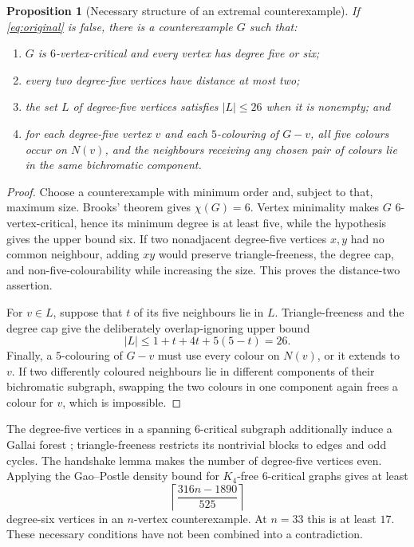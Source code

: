 \documentclass[11pt]{amsart}
\newtheorem{proposition}{Proposition}[section]
\theoremstyle{definition}
\begin{document}
\begin{proposition}[Necessary structure of an extremal counterexample]
If \eqref{eq:original} is false, there is a counterexample $G$ such that:
\begin{enumerate}
  \item $G$ is $6$-vertex-critical and every vertex has degree five or six;
  \item every two degree-five vertices have distance at most two;
  \item the set $L$ of degree-five vertices satisfies $|L|\leq26$ when it is
        nonempty; and
  \item for each degree-five vertex $v$ and each $5$-colouring of $G-v$, all
        five colours occur on $N(v)$, and the neighbours receiving any chosen
        pair of colours lie in the same bichromatic component.
\end{enumerate}
\end{proposition}

\begin{proof}
Choose a counterexample with minimum order and, subject to that, maximum size.
Brooks' theorem gives $\chi(G)=6$.  Vertex minimality makes $G$
$6$-vertex-critical, hence its minimum degree is at least five, while the
hypothesis gives the upper bound six.  If two nonadjacent degree-five
vertices $x,y$ had no common neighbour, adding $xy$ would preserve
triangle-freeness, the degree cap, and non-five-colourability while increasing
the size.  This proves the distance-two assertion.

For $v\in L$, suppose that $t$ of its five neighbours lie in $L$.
Triangle-freeness and the degree cap give the deliberately overlap-ignoring
upper bound
\[
 |L|\leq1+t+4t+5(5-t)=26.
\]
Finally, a $5$-colouring of $G-v$ must use every colour on $N(v)$, or it
extends to $v$.  If two differently coloured neighbours lie in different
components of their bichromatic subgraph, swapping the two colours in one
component again frees a colour for $v$, which is impossible.
\end{proof}

The degree-five vertices in a spanning $6$-critical subgraph additionally
induce a Gallai forest \cite{Gallai1963}; triangle-freeness restricts its
nontrivial blocks to edges and odd cycles.  The handshake lemma makes the
number of degree-five vertices even.  Applying the Gao--Postle density bound
for $K_4$-free $6$-critical graphs \cite{GaoPostle2018} gives at least
\[
  \left\lceil\frac{316n-1890}{525}\right\rceil
\]
degree-six vertices in an $n$-vertex counterexample.  At $n=33$ this is at
least $17$.  These necessary conditions have not been combined into a
contradiction.
\end{document}
